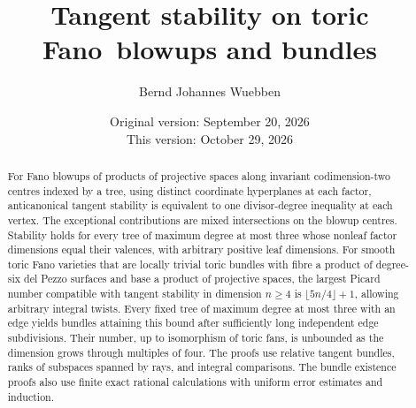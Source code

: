 \documentclass[11pt]{amsart}
\title[Tangent stability on toric Fano varieties]{Tangent stability on toric Fano\ blowups and bundles}
\author{Bernd Johannes Wuebben}
\date{Original version: September 20, 2026\\This version: October 29, 2026}
\theoremstyle{definition}
\theoremstyle{remark}
\begin{document}
\begin{abstract}
For Fano blowups of products of projective spaces along invariant
codimension-two centres indexed by a tree, using distinct coordinate
hyperplanes at each factor, anticanonical tangent stability is equivalent
to one divisor-degree inequality at each vertex. The exceptional contributions are mixed intersections on
the blowup centres. Stability holds for every tree of maximum degree
at most three whose nonleaf factor dimensions equal their valences, with arbitrary
positive leaf dimensions.
For smooth toric Fano varieties that are locally trivial toric bundles
with fibre a product of degree-six
del Pezzo surfaces and base a product of projective spaces, the largest
Picard number compatible with tangent stability in dimension $n\ge4$
is $\lfloor5n/4\rfloor+1$, allowing arbitrary integral twists.
Every fixed tree of maximum degree at most three with an edge yields bundles
attaining this bound after sufficiently long independent edge subdivisions.
Their number, up to isomorphism of toric fans, is unbounded as the
dimension grows through multiples of four. The proofs use relative
tangent bundles, ranks of subspaces spanned by rays, and integral
comparisons. The bundle existence proofs also use finite exact rational
calculations with uniform error estimates and induction.
\end{abstract}
\maketitle

\tableofcontents












\appendix








\end{document}
